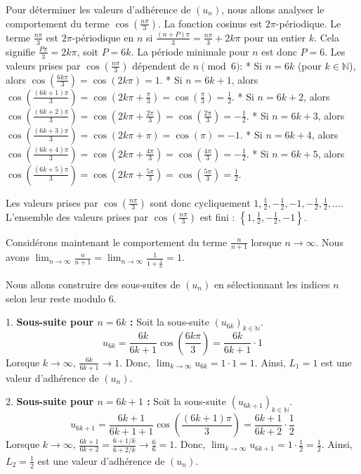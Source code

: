 \documentclass{report}
\begin{document}
Pour déterminer les valeurs d'adhérence de $(u_n)$, nous allons analyser le comportement du terme $\cos\left(\frac{n\pi}{3}\right)$. La fonction cosinus est $2\pi$-périodique. Le terme $\frac{n\pi}{3}$ est $2\pi$-périodique en $n$ si $\frac{(n+P)\pi}{3} = \frac{n\pi}{3} + 2k\pi$ pour un entier $k$. Cela signifie $\frac{P\pi}{3} = 2k\pi$, soit $P=6k$. La période minimale pour $n$ est donc $P=6$.
Les valeurs prises par $\cos\left(\frac{n\pi}{3}\right)$ dépendent de $n \pmod 6$:
*   Si $n = 6k$ (pour $k \in \mathbb{N}$), alors $\cos\left(\frac{6k\pi}{3}\right) = \cos(2k\pi) = 1$.
*   Si $n = 6k+1$, alors $\cos\left(\frac{(6k+1)\pi}{3}\right) = \cos\left(2k\pi + \frac{\pi}{3}\right) = \cos\left(\frac{\pi}{3}\right) = \frac{1}{2}$.
*   Si $n = 6k+2$, alors $\cos\left(\frac{(6k+2)\pi}{3}\right) = \cos\left(2k\pi + \frac{2\pi}{3}\right) = \cos\left(\frac{2\pi}{3}\right) = -\frac{1}{2}$.
*   Si $n = 6k+3$, alors $\cos\left(\frac{(6k+3)\pi}{3}\right) = \cos\left(2k\pi + \pi\right) = \cos(\pi) = -1$.
*   Si $n = 6k+4$, alors $\cos\left(\frac{(6k+4)\pi}{3}\right) = \cos\left(2k\pi + \frac{4\pi}{3}\right) = \cos\left(\frac{4\pi}{3}\right) = -\frac{1}{2}$.
*   Si $n = 6k+5$, alors $\cos\left(\frac{(6k+5)\pi}{3}\right) = \cos\left(2k\pi + \frac{5\pi}{3}\right) = \cos\left(\frac{5\pi}{3}\right) = \frac{1}{2}$.

Les valeurs prises par $\cos\left(\frac{n\pi}{3}\right)$ sont donc cycliquement $1, \frac{1}{2}, -\frac{1}{2}, -1, -\frac{1}{2}, \frac{1}{2}, \dots$.
L'ensemble des valeurs prises par $\cos\left(\frac{n\pi}{3}\right)$ est fini : $\left\{1, \frac{1}{2}, -\frac{1}{2}, -1\right\}$.

Considérons maintenant le comportement du terme $\frac{n}{n+1}$ lorsque $n \to \infty$.
Nous avons $\lim_{n \to \infty} \frac{n}{n+1} = \lim_{n \to \infty} \frac{1}{1 + \frac{1}{n}} = 1$.

Nous allons construire des sous-suites de $(u_n)$ en sélectionnant les indices $n$ selon leur reste modulo 6.

1.  \textbf{Sous-suite pour $n=6k$ :}
    Soit la sous-suite $(u_{6k})_{k \in \mathbb{N}}$.
    $$u_{6k} = \frac{6k}{6k+1} \cos\left(\frac{6k\pi}{3}\right) = \frac{6k}{6k+1} \cdot 1$$
    Lorsque $k \to \infty$, $\frac{6k}{6k+1} \to 1$.
    Donc, $\lim_{k \to \infty} u_{6k} = 1 \cdot 1 = 1$.
    Ainsi, $L_1 = 1$ est une valeur d'adhérence de $(u_n)$.

2.  \textbf{Sous-suite pour $n=6k+1$ :}
    Soit la sous-suite $(u_{6k+1})_{k \in \mathbb{N}}$.
    $$u_{6k+1} = \frac{6k+1}{6k+1+1} \cos\left(\frac{(6k+1)\pi}{3}\right) = \frac{6k+1}{6k+2} \cdot \frac{1}{2}$$
    Lorsque $k \to \infty$, $\frac{6k+1}{6k+2} = \frac{6 + 1/k}{6 + 2/k} \to \frac{6}{6} = 1$.
    Donc, $\lim_{k \to \infty} u_{6k+1} = 1 \cdot \frac{1}{2} = \frac{1}{2}$.
    Ainsi, $L_2 = \frac{1}{2}$ est une valeur d'adhérence de $(u_n)$.
\end{document}
